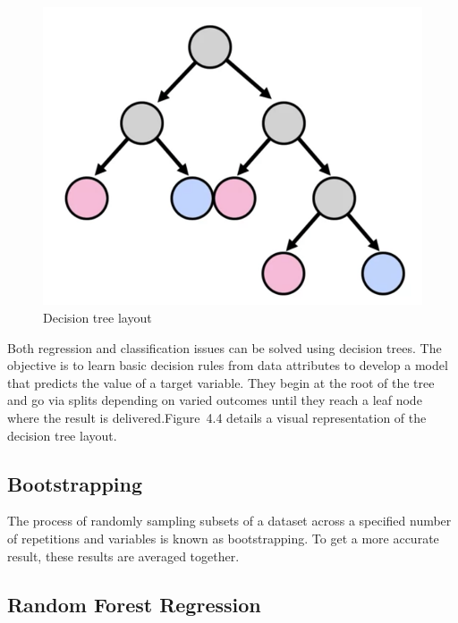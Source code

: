 \begin{figure}[h]
\centering
\includegraphics[scale=.5]{./figures/dectree.png}
\caption{Decision tree layout}
\label{fig1}
\end{figure}

Both regression and classification issues can be solved using decision trees. The objective is to learn basic decision rules from data attributes to develop a model that predicts the value of a target variable. They begin at the root of the tree and go via splits depending on varied outcomes until they reach a leaf node where the result is delivered.Figure~4.4 details a visual representation of the decision
tree layout.

\subsection{Bootstrapping}

The process of randomly sampling subsets of a dataset across a specified number of repetitions and variables is known as bootstrapping. To get a more accurate result, these results are averaged together.

\subsection{Random Forest Regression}

